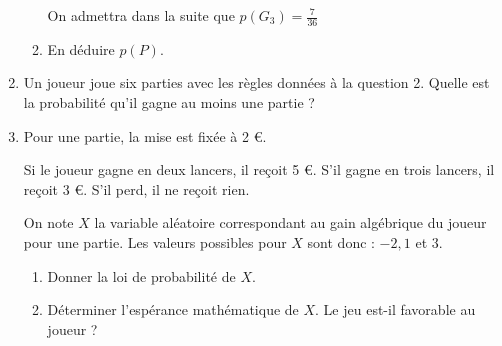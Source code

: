 \begin{enumerate}
\begin{enumerate}[label=\alph*.]
          \par
          On admettra dans la suite que $p\left(G_{3}\right)=\frac{7}{36}$
          \item
          En déduire $p \left(P\right)$.
     \end{enumerate}
     \item
     Un joueur joue six parties avec les règles données à la question 2. Quelle est la probabilité qu'il gagne au moins une partie ?
     \item
     Pour une partie, la mise est fixée à 2 €.
     \par
     Si le joueur gagne en deux lancers, il reçoit 5 €. S'il gagne en trois lancers, il reçoit 3 €. S'il perd, il ne reçoit rien.
     \par
     On note $X$ la variable aléatoire correspondant au gain algébrique du joueur pour une partie. Les valeurs possibles pour $X$ sont donc : $-2, 1$ et $3$.
     \begin{enumerate}[label=\alph*.]
          \item
          Donner la loi de probabilité de $X$.
          \item
          Déterminer l'espérance mathématique de $X$. Le jeu est-il favorable au joueur ?
     \end{enumerate}
\end{enumerate}
